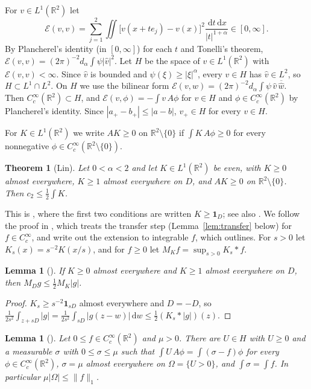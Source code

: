 \documentclass[11pt]{amsart}
\newtheorem{theorem}[equation]{Theorem}
\newtheorem{lemma}[equation]{Lemma}
\theoremstyle{definition}
\theoremstyle{remark}
\numberwithin{equation}{section}
\newcommand{\R}{\mathbb{R}}
\newcommand{\dd}{\,\mathrm{d}}
\newcommand{\Cc}{C_c^\infty}
\begin{document}
For $v\in L^1(\R^2)$ let
\[
\mathcal E(v,v)=\sum_{j=1}^2\iint\bigl[v(x+te_j)-v(x)\bigr]^2\frac{\dd t\dd x}{|t|^{1+\alpha}}\in[0,\infty].
\]
By Plancherel's identity (in $[0,\infty]$) for each $t$ and Tonelli's theorem, $\mathcal E(v,v)=(2\pi)^{-2}d_\alpha\int\psi|\hat v|^2$. Let $H$ be the space of $v\in L^1(\R^2)$ with $\mathcal E(v,v)<\infty$. Since $\hat v$ is bounded and $\psi(\xi)\ge|\xi|^\alpha$, every $v\in H$ has $\hat v\in L^2$, so $H\subset L^1\cap L^2$. On $H$ we use the bilinear form $\mathcal E(v,w)=(2\pi)^{-2}d_\alpha\int\psi\,\hat v\,\overline{\hat w}$. Then $\Cc(\R^2)\subset H$, and $\mathcal E(v,\phi)=-\int v\,A\phi$ for $v\in H$ and $\phi\in\Cc(\R^2)$ by Plancherel's identity. Since $|a_+-b_+|\le|a-b|$, $v_+\in H$ for every $v\in H$.

For $K\in L^1(\R^2)$ we write $AK\ge0$ on $\R^2\setminus\{0\}$ if $\int K\,A\phi\ge0$ for every nonnegative $\phi\in\Cc(\R^2\setminus\{0\})$.

\begin{theorem}[Lin]\label{thm:principle}
Let $0<\alpha<2$ and let $K\in L^1(\R^2)$ be even, with $K\ge0$ almost everywhere, $K\ge1$ almost everywhere on $D$, and $AK\ge0$ on $\R^2\setminus\{0\}$. Then $c_2\le\frac12\int K$.
\end{theorem}

This is \cite[Theorem~1]{Lin26a}, where the first two conditions are written $K\ge\mathbf 1_D$; see also \cite[Principle~2 and Corollary~3.1]{Lin26c}. We follow the proof in \cite{Lin26a}, which treats the transfer step (Lemma~\ref{lem:transfer} below) for $f\in\Cc$, and write out the extension to integrable $f$, which \cite{Lin26c} outlines. For $s>0$ let $K_s(x)=s^{-2}K(x/s)$, and for $f\ge0$ let $M_Kf=\sup_{s>0}K_s*f$.

\begin{lemma}[{\cite[Lemma~1]{Lin26a}}]\label{lem:domination}
If $K\ge0$ almost everywhere and $K\ge1$ almost everywhere on $D$, then $M_Dg\le\frac12M_K|g|$.
\end{lemma}

\begin{proof}
$K_s\ge s^{-2}\mathbf 1_{sD}$ almost everywhere and $D=-D$, so $\frac{1}{2s^2}\int_{z+sD}|g|=\frac{1}{2s^2}\int_{sD}|g(z-w)|\dd w\le\frac12(K_s*|g|)(z)$.
\end{proof}

\begin{lemma}[{\cite[Lemma~2]{Lin26a}}]\label{lem:obstacle}
Let $0\le f\in\Cc(\R^2)$ and $\mu>0$. There are $U\in H$ with $U\ge0$ and a measurable $\sigma$ with $0\le\sigma\le\mu$ such that $\int U\,A\phi=\int(\sigma-f)\phi$ for every $\phi\in\Cc(\R^2)$, $\sigma=\mu$ almost everywhere on $\Omega=\{U>0\}$, and $\int\sigma=\int f$. In particular $\mu|\Omega|\le\|f\|_1$.
\end{lemma}
\end{document}
